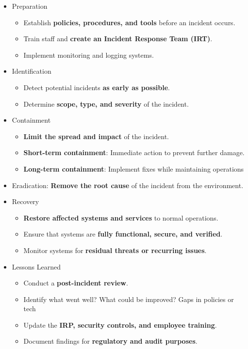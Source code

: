 \begin{itemize}
    \item Preparation
        \begin{itemize}
            \item Establish \textbf{policies, procedures, and tools} before an incident occurs.
            \item Train staff and \textbf{create an Incident Response Team (IRT)}.
            \item Implement monitoring and logging systems.
        \end{itemize}
    \item Identification
        \begin{itemize}
            \item Detect potential incidents \textbf{as early as possible}.
            \item Determine \textbf{scope, type, and severity} of the incident.
        \end{itemize}
    \item Containment
        \begin{itemize}
            \item \textbf{Limit the spread and impact} of the incident.
            \item \textbf{Short-term containment}: Immediate action to prevent further damage.
            \item \textbf{Long-term containment}: Implement fixes while maintaining operations
        \end{itemize}
    \item Eradication: \textbf{Remove the root cause} of the incident from the environment.
    \item Recovery
        \begin{itemize}
            \item \textbf{Restore affected systems and services} to normal operations.
            \item Ensure that systems are \textbf{fully functional, secure, and verified}.
            \item Monitor systems for \textbf{residual threats or recurring issues}.
        \end{itemize}
    \item Lessons Learned
        \begin{itemize}
            \item Conduct a \textbf{post-incident review}.
            \item Identify what went well? What could be improved? Gaps in policies or tech
            \item Update the \textbf{IRP, security controls, and employee training}.
            \item Document findings for \textbf{regulatory and audit purposes}.
        \end{itemize}
\end{itemize}

